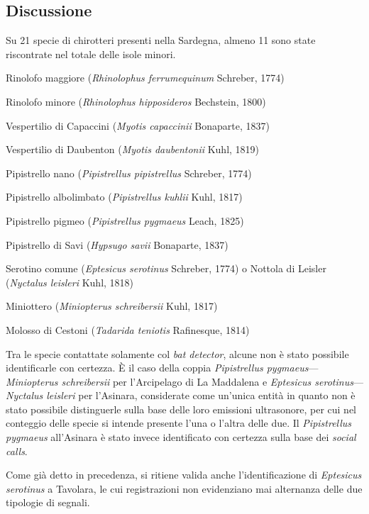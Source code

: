 \begin{multicols}{2}
\begin{compactdesc}
\section*{Discussione}
Su 21 specie di chirotteri presenti nella Sardegna, almeno 11 sono state riscontrate nel totale delle isole minori.
\begin{compactitem}
\item Rinolofo maggiore (\emph{Rhinolophus ferrumequinum} Schreber, 1774)
\item Rinolofo minore (\emph{Rhinolophus hipposideros} Bechstein, 1800)
\item Vespertilio di Capaccini (\emph{Myotis capaccinii} Bonaparte, 1837)
\item Vespertilio di Daubenton (\emph{Myotis daubentonii} Kuhl, 1819)
\item Pipistrello nano (\emph{Pipistrellus pipistrellus} Schreber, 1774)
\item Pipistrello albolimbato (\emph{Pipistrellus kuhlii} Kuhl, 1817)
\item Pipistrello pigmeo (\emph{Pipistrellus pygmaeus} Leach, 1825)
\item Pipistrello di Savi (\emph{Hypsugo savii} Bonaparte, 1837)
\item Serotino comune (\emph{Eptesicus serotinus} Schreber, 1774) o Nottola di Leisler (\emph{Nyctalus leisleri} Kuhl, 1818)
\item Miniottero (\emph{Miniopterus schreibersii} Kuhl, 1817)
\item Molosso di Cestoni (\emph{Tadarida teniotis} Rafinesque, 1814)
\end{compactitem}

Tra le specie contattate solamente col \textit{bat detector}, alcune non è stato possibile identificarle con certezza. È il caso della coppia \emph{Pipistrellus pygmaeus}---\emph{Miniopterus schreibersii} per l’Arcipelago di La Maddalena e \emph{Eptesicus serotinus}---\emph{Nyctalus leisleri} per l’Asinara, considerate come un’unica entità in quanto non è stato possibile distinguerle sulla base delle loro emissioni ultrasonore, per cui nel conteggio delle specie si intende presente l’una o l’altra delle due. Il \emph{Pipistrellus pygmaeus} all’Asinara è stato invece identificato con certezza sulla base dei \textit{social calls}. 

Come già detto in precedenza, si ritiene valida anche l’identificazione di \emph{Eptesicus serotinus} a Tavolara, le cui registrazioni non evidenziano mai alternanza delle due tipologie di segnali.


\end{compactdesc}
\end{multicols}
